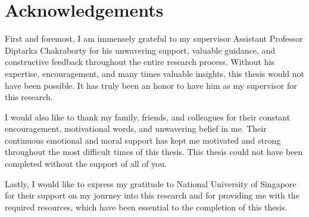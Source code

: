 \chapter*{Acknowledgements}
First and foremost, I am immensely grateful to my supervisor Assistant Professor Diptarka Chakraborty for his unwavering support, valuable guidance, and constructive feedback throughout the entire research process. Without his expertise, encouragement, and many times valuable insights, this thesis would not have been possible. It has truly been an honor to have him as my supervisor for this research.

I would also like to thank my family, friends, and colleagues for their constant encouragement, motivational words, and unwavering belief in me. Their continuous emotional and moral support has kept me motivated and strong throughout the most difficult times of this thesis. This thesis could not have been completed without the support of all of you.

Lastly, I would like to express my gratitude to National University of Singapore for their support on my journey into this research and for providing me with the required resources, which have been essential to the completion of this thesis.


